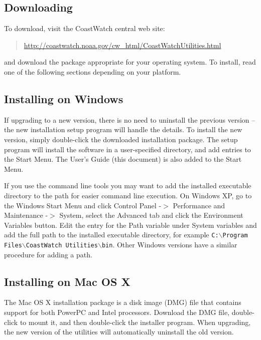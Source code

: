 {\subsection{Downloading}

To download, visit the CoastWatch central web site: 
\begin{quote}
  \url{http://coastwatch.noaa.gov/cw\_html/CoastWatchUtilities.html}
\end{quote}
and download the package appropriate for your operating system. To
install, read one of the following sections depending on your
platform.

\subsection{Installing on Windows}

If upgrading to a new version, there is no need to uninstall the
previous version -- the new installation setup program will handle
the details.  To install the new version, simply double-click the
downloaded installation package. The setup program will install the
software in a user-specified directory, and add entries to the Start
Menu.  The User's Guide (this document) is also added to the Start
Menu.

If you use the command line tools you may want to add the installed
executable directory to the path for easier command line execution.
On Windows XP, go to the Windows {\gui Start Menu} and click {\gui
Control Panel} -$>$ {\gui Performance and Maintenance} -$>$ {\gui
System}, select the {\gui Advanced} tab and click the {\gui Environment
Variables} button. Edit the entry for the {\gui Path} variable under
{\gui System variables} and add the full path to the installed
executable directory, for example {\tt C:$\backslash$Program
Files$\backslash$CoastWatch Utilities$\backslash$bin}. Other Windows
versions have a similar procedure for adding a path.

\subsection{Installing on Mac OS X}

The Mac OS X installation package is a disk image (DMG) file that
contains support for both PowerPC and Intel processors.  
Download the DMG file, double-click to mount it, and then
double-click the installer program.  When upgrading, the new version
of the utilities will automatically uninstall the old version.

}

